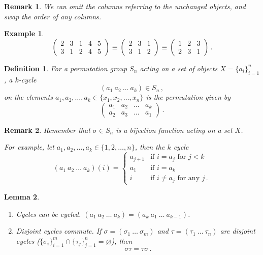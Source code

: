 \documentclass{article}
\theoremstyle{plain}\theoremheaderfont{\normalfont\itshape}\theorembodyfont{\rmfamily}\theoremseparator{.}\newtheorem*{rem}{Remark}\newtheorem*{ex}{Example}\newtheorem*{proof}{Proof}\newtheorem*{altp}{Alternative proof}
\theoremstyle{plain}\theoremheaderfont{\normalfont\bfseries}\theorembodyfont{\rmfamily}\theoremseparator{.}\newtheorem{thm}{Theorem}[section]\newtheorem{lem}[thm]{Lemma}\newtheorem{prop}[thm]{Proposition}\newtheorem*{cor}{Corollary}\newtheorem{defn}[thm]{Definition}\newtheorem{clm}[thm]{Claim}\newtheorem{clminproof}{Claim}
\theoremstyle{break}\theoremheaderfont{\normalfont\itshape}\theorembodyfont{\rmfamily}\theoremseparator{.\medskip}\newtheorem*{proofskip}{Proof}\newtheorem*{exs}{Examples}\newtheorem*{rems}{Remarks}
\theoremstyle{break}\theoremheaderfont{\normalfont\bfseries}\theorembodyfont{\rmfamily}\theoremseparator{.\medskip}\newtheorem{lemskip}[thm]{Lemma}\newtheorem{defnskip}[thm]{Definition}\newtheorem{propskip}[thm]{Proposition}\newtheorem{thmskip}[thm]{Theorem}
\numberwithin{equation}{section}
\begin{document}
	\begin{rem}
		We can omit the columns referring to the unchanged objects, and swap the order of any columns.
	\end{rem}
	\begin{ex}
		\[\begin{pmatrix}
			2 & 3 & 1 & 4 & 5\\
			3 & 1 & 2 & 4 & 5
		\end{pmatrix}\equiv\begin{pmatrix}
			2 & 3 & 1\\
			3 & 1 & 2
		\end{pmatrix}\equiv\begin{pmatrix}
			1 & 2 & 3\\
			2 & 3 & 1
		\end{pmatrix}\,.\]
	\end{ex}
	\begin{defn}
		For a permutation group \(S_n\) acting on a set of objects \(X=\{a_i\}_{i=1}^{n}\), a \(k\)-cycle
		\[(a_1~a_2~\dots~a_k)\in S_n\,,\]
		on the elements \(a_1,a_2,\dots,a_k\in\{x_1,x_2,\dots,x_n\}\) is the permutation given by
		\[\begin{pmatrix}
			a_1 & a_2 & \dots & a_k\\
			a_2 & a_3 & \dots & a_1
		\end{pmatrix}\,.\]
	\end{defn}
	\begin{rem}
		Remember that \(\sigma\in S_n\) is a bijection function acting on a set \(X\).

		For example, let \(a_1,a_2,\dots,a_k\in\{1,2,\dots,n\}\), then the \(k\) cycle
		\[(a_1~a_2~\dots ~a_k)(i)=\begin{cases}
			a_{j+1} & \text{if }i=a_j\text{ for }j<k\\
			a_1 & \text{if }i=a_k\\
			i & \text{if }i\ne a_j \text{ for any } j\,.
		\end{cases}\]
	\end{rem}
	\begin{lemskip}
		\begin{enumerate}
			\item[(i)] Cycles can be cycled. \((a_1~a_2~\dots~a_k)=(a_k~a_1~\dots~a_{k-1})\).
			\item[(ii)] Disjoint cycles commute. If \(\sigma=(\sigma_1~\dots~\sigma_m)\) and \(\tau=(\tau_1~\dots~\tau_n)\) are disjoint cycles (\(\{\sigma_i\}_{i=1}^{m}\cap\{\tau_j\}_{j=1}^{n}=\varnothing\)), then
			\[\sigma\tau=\tau\sigma\,.\]
		\end{enumerate}
	\end{lemskip}
\end{document}
